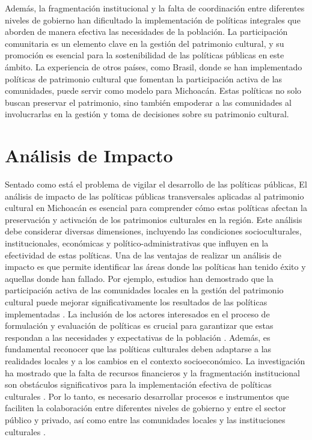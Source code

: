 \documentclass[
  spanish,
  11pt,
  a4paper,
]{scrbook}
\begin{document}
Además, la fragmentación institucional y la falta de coordinación entre
diferentes niveles de gobierno han dificultado la implementación de
políticas integrales que aborden de manera efectiva las necesidades de
la población. La participación comunitaria es un elemento clave en la
gestión del patrimonio cultural, y su promoción es esencial para la
sostenibilidad de las políticas públicas en este ámbito. La experiencia
de otros países, como Brasil, donde se han implementado políticas de
patrimonio cultural que fomentan la participación activa de las
comunidades, puede servir como modelo para Michoacán. Estas políticas no
solo buscan preservar el patrimonio, sino también empoderar a las
comunidades al involucrarlas en la gestión y toma de decisiones sobre su
patrimonio cultural.

\section*{Análisis de Impacto}\label{anuxe1lisis-de-impacto}


Sentado como está el problema de vigilar el desarrollo de las políticas
públicas, El análisis de impacto de las políticas públicas transversales
aplicadas al patrimonio cultural en Michoacán es esencial para
comprender cómo estas políticas afectan la preservación y activación de
los patrimonios culturales en la región. Este análisis debe considerar
diversas dimensiones, incluyendo las condiciones socioculturales,
institucionales, económicas y político-administrativas que influyen en
la efectividad de estas políticas. Una de las ventajas de realizar un
análisis de impacto es que permite identificar las áreas donde las
políticas han tenido éxito y aquellas donde han fallado. Por ejemplo,
estudios han demostrado que la participación activa de las comunidades
locales en la gestión del patrimonio cultural puede mejorar
significativamente los resultados de las políticas implementadas
\autocite{Xiao2022,Shirvani2019}. La inclusión de los actores
interesados en el proceso de formulación y evaluación de políticas es
crucial para garantizar que estas respondan a las necesidades y
expectativas de la población \autocite{Shirvani2019}. Además, es
fundamental reconocer que las políticas culturales deben adaptarse a las
realidades locales y a los cambios en el contexto socioeconómico. La
investigación ha mostrado que la falta de recursos financieros y la
fragmentación institucional son obstáculos significativos para la
implementación efectiva de políticas culturales
\autocite{Simbirtseva2020,Fatoric2017}. Por lo tanto, es necesario
desarrollar procesos e instrumentos que faciliten la colaboración entre
diferentes niveles de gobierno y entre el sector público y privado, así
como entre las comunidades locales y las instituciones culturales
\autocite{Sulaj2023}.
\end{document}
